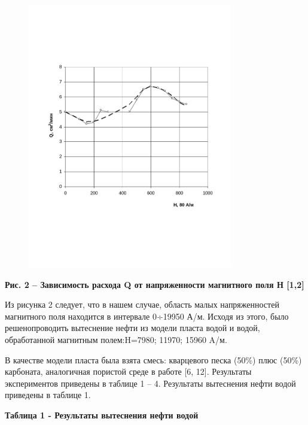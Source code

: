 {{\begin{figure}[H]
	\centering
	\includegraphics[width=0.8\textwidth]{media/gorn4/image3}
	\caption*{}
\end{figure}


{\bfseries Рис. 2 -- Зависимость расхода Q от напряженности магнитного поля
Н {[}1,2{]}}

Из рисунка 2 следует, что в нашем случае, область малых напряженностей
магнитного поля находится в интервале 0÷19950 А/м. Исходя из этого, было
решенопроводить вытеснение нефти из модели пласта водой и водой,
обработанной магнитным полем:H=7980; 11970; 15960 A/м.

В качестве модели пласта была взята смесь: кварцевого песка (50\%) плюс
(50\%) карбоната, аналогичная пористой среде в работе {[}6, 12{]}.
Результаты экспериментов приведены в таблице 1 -- 4. Результаты
вытеснения нефти водой приведены в таблице 1.

{\bfseries Таблица 1 - Результаты вытеснения нефти водой}

}}
